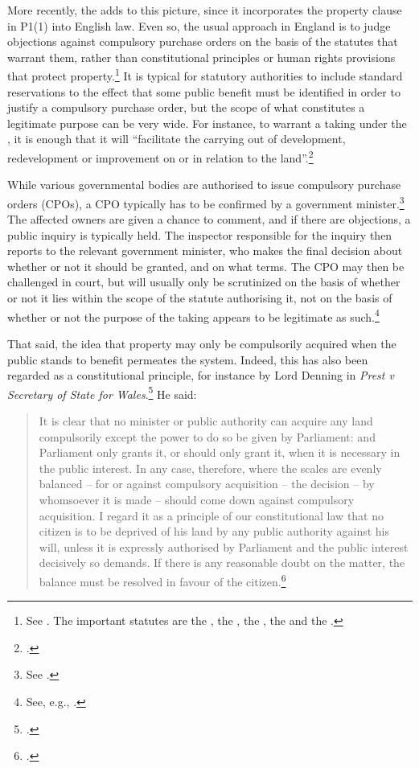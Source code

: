 More recently, the \cite{hra98} adds to this picture, since it incorporates the property clause in P1(1) into English law. Even so, the usual approach in England is to judge objections against compulsory purchase orders on the basis of the statutes that warrant them, rather than constitutional principles or human rights provisions that protect property.\footnote{See \cite[121-132]{waring09}. The important statutes are the \cite{ala81}, the \cite{lca61}, the \cite{cpa65}, the \cite{tcpa90} and the \cite{pcpa04}.} It is typical for statutory authorities to include standard reservations to the effect that some public benefit must be identified in order to justify a compulsory purchase order, but the scope of what constitutes a legitimate purpose can be very wide. For instance, to warrant a taking under the \cite{tcpa90}, it is enough that it will ``facilitate the carrying out of development, redevelopment or improvement on or in relation to the land''.\footcite[226]{tcpa90} 

While various governmental bodies are authorised to issue compulsory purchase orders (CPOs), a CPO typically has to be confirmed by a government minister.\footnote{See \cite[48]{waring09}.} The affected owners are given a chance to comment, and if there are objections, a public inquiry is typically held. The inspector responsible for the inquiry then reports to the relevant government minister, who makes the final decision about whether or not it should be granted, and on what terms. The CPO may then be challenged in court, but will usually only be scrutinized on the basis of whether or not it lies within the scope of the statute authorising it, not on the basis of whether or not the purpose of the taking appears to be legitimate as such.\footnote{See, e.g., \cite[48-49]{waring09}.}

That said, the idea that property may only be compulsorily acquired when the public stands to benefit permeates the system. Indeed, this has also been regarded as a constitutional principle, for instance by Lord Denning in {\it Prest v Secretary of State for Wales}.\footcite{prest82} He said:

\begin{quote}
It is clear that no minister or public authority can acquire any land compulsorily except the power to do so be given by Parliament: and Parliament only grants it, or should only grant it, when it is necessary in the public interest. In any case, therefore, where the scales are evenly balanced – for or against compulsory acquisition – the decision – by whomsoever it is made – should come down against compulsory acquisition. I regard it as a principle of our constitutional law that no citizen is to be deprived of his land by any public authority against his will, unless it is expressly authorised by Parliament and the public interest decisively so demands. If there is any reasonable doubt on the matter, the balance must be resolved in favour of the citizen.\footcite[198]{prest82}
\end{quote}

